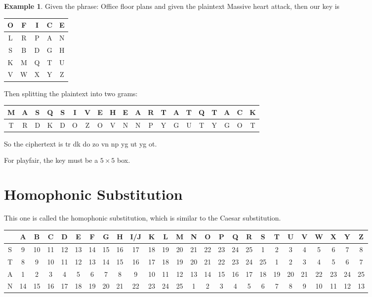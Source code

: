 \documentclass[11pt]{article}
\theoremstyle{definition}\newtheorem{definition}{Definition}
\theoremstyle{definition}\newtheorem{example}{Example}
\theoremstyle{definition}\newtheorem{samplecode}{Sample Code}
\begin{document}
\begin{example}
    Given the phrase: \textsf{Office floor plans} and given the plaintext \textsf{Massive heart attack}, then our key is
    \begin{center}
        \begin{tabular}{|c|c|c|c|c|} \hline
            O & F & I & C & E \\ \hline
            L & R & P & A & N \\ \hline
            S & B & D & G & H \\ \hline
            K & M & Q & T & U \\ \hline
            V & W & X & Y & Z \\ \hline
        \end{tabular}
    \end{center}
    Then splitting the plaintext into two grams:
    \begin{center} \small
        \begin{tabular}{|cc|cc|cc|cc|cc|cc|cc|cc|cc|cc|} \hline
            M & A & S & Q & S & I & V & E & H & E & A & R & T & A & T & Q & T & A & C & K \\ \hline 
            T & R & D & K & D & O & Z & O & V & N & N & P & Y & G & U & T & Y & G & O & T \\ \hline
        \end{tabular}
    \end{center}
    So the ciphertext is \textsf{tr dk do zo vn np yg ut yg ot}.
\end{example}

For playfair, the key must be a $5 \times 5$ box.

\section{Homophonic Substitution}

This one is called the homophonic substitution, which is similar to the Caesar substitution.
\begin{center}\tiny
    \begin{tabular}{c|ccccccccccccccccccccccccc}
        & A & B & C & D & E & F & G & H & I/J & K & L & M & N & O & P & Q & R & S & T & U & V & W & X & Y & Z \\ \hline
        S & 9 & 10 & 11 & 12 & 13 & 14 & 15 & 16 & 17 & 18 & 19 & 20 & 21 & 22 & 23 & 24 & 25 & 1 & 2 & 3 & 4 & 5 & 6 & 7 & 8 \\
        T & 8 & 9 & 10 & 11 & 12 & 13 & 14 & 15 & 16 & 17 & 18 & 19 & 20 & 21 & 22 & 23 & 24 & 25 & 1 & 2 & 3 & 4 & 5 & 6 & 7 \\
        A & 1 & 2 & 3 & 4 & 5 & 6 & 7 & 8 & 9 & 10 & 11 & 12 & 13 & 14 & 15 & 16 & 17 & 18 & 19 & 20 & 21 & 22 & 23 & 24 & 25 \\
        N & 14 & 15 & 16 & 17 & 18 & 19 & 20 & 21 & 22 & 23 & 24 & 25 & 1 & 2 & 3 & 4 & 5 & 6 & 7 & 8 & 9 & 10 & 11 & 12 & 13 \\
    \end{tabular}
\end{center}
\end{document}
